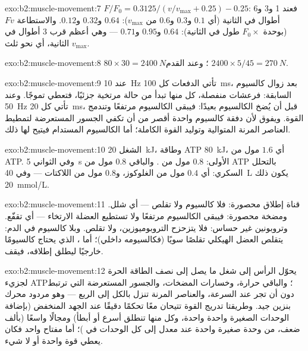 \begin{solution}{exo:b2:muscle-movement:7}
$F/F_0 = 0.3125/(v/v_{\max} + 0.25) - 0.25$: فعند 1 و3 و6 أطوال في
الثانية (أي $0.1$ و$0.3$ و$0.6$ من $v_{\max}$): $0.64$ و$0.32$ و$0.12$.
والاستطاعة $Fv$ (بوحدة $F_0\times$ طول في الثانية): $0.64$ و$0.95$ و$0.71$
--- وهي أعظم قرب 3 أطوال في الثانية، أي نحو ثلث $v_{\max}$.
\end{solution}

\begin{solution}{exo:b2:muscle-movement:8}
$80\times 30 = \qty{2400}{N}$؛ وعند القدم $2400\times 5/45 =
\qty{270}{N}$.
\end{solution}

\begin{solution}{exo:b2:muscle-movement:9}
عند \qty{10}{Hz} تأتي الدفعات كل \qty{100}{ms}، بعد
زوال كالسيوم السابقة: فرعشات منفصلة، كل منها
تبدأ من حالة مرتخية جزئيًا، فتعطي تموجًا. وعند
\qty{50}{Hz} تأتي كل \qty{20}{ms}، قبل أن يُضخ الكالسيوم
بعيدًا: فيبقى الكالسيوم مرتفعًا وتندمج القوة. ويفوق
  لأن دفقة كالسيوم واحدة أقصر من
أن تكفي الجسور المستعرضة لتمطيط العناصر المرنة المتوالية
وتوليد القوة الكاملة؛ أما الكالسيوم المستدام فيتيح لها ذلك.
\end{solution}

\begin{solution}{exo:b2:muscle-movement:10}
الشغل \qty{20}{kJ}، وطاقة ATP \qty{80}{kJ}، أي $1.6$ مول من ATP. وفي الثواني
\qty{5}{s} الأولى: $0.8$ مول من . والباقي $0.8$ مول من ATP
بالتحلل السكري: أي $0.4$ مول من الغلوكوز، و$0.8$ مول من اللاكتات --- وفي
\qty{40}{L} يكون ذلك \qty{20}{mmol/L}.
\end{solution}

\begin{solution}{exo:b2:muscle-movement:11}
قناة إطلاق محصورة: فلا كالسيوم ولا تقلص --- أي شلل.
ومضخة محصورة: فيبقى الكالسيوم مرتفعًا ولا تستطيع العضلة الارتخاء --- أي
تقفّع. وتروبونين غير حساس: فلا يتزحزح التروبوميوزين، ولا
تقلص. وبلا كالسيوم في الدم: يتقلص العضل الهيكلي
تقلصًا سويًا (فكالسيومه داخلي)؛ أما ، الذي يحتاج
كالسيومًا خارجيًا ليطلق إطلاقه، فيقف.
\end{solution}

\begin{solution}{exo:b2:muscle-movement:12}
يحوّل الرأس إلى شغل ما يصل إلى نصف الطاقة الحرة لجزيء ATP؛
والباقي حرارة، وخسارات المضخات، والجسور المستعرضة
التي ترتبط دون أن تجر عند السرعة، والعناصر المرنة
تنزل بالكل إلى الربع --- وهو مردود محرك بنزين
جيد. وطريقتا تدريج القوة تتيحان معًا تحكمًا دقيقًا عند الجهد
المنخفض (بإضافة الوحدات الصغيرة واحدة واحدة، وكل منها تنطلق أسرع أو
أبطأ) ومجالًا واسعًا (بألف ضعف، من وحدة صغيرة واحدة عند
معدل  إلى كل الوحدات في )؛ أما مفتاح واحد فكان يعطي
قوة واحدة أو لا شيء.
\end{solution}

